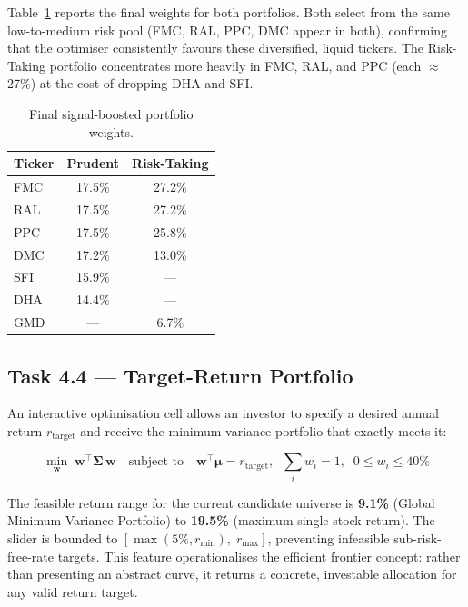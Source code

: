 \documentclass[12pt, a4paper]{article}
\begin{document}
Table~\ref{tab:portfolio_weights} reports the final weights for
both portfolios. Both select from the same low-to-medium risk
pool (FMC, RAL, PPC, DMC appear in both), confirming that the
optimiser consistently favours these diversified, liquid tickers.
The Risk-Taking portfolio concentrates more heavily in FMC, RAL,
and PPC (each $\approx$27\%) at the cost of dropping DHA and SFI.

\begin{table}[h]
\centering
\caption{Final signal-boosted portfolio weights.}
\label{tab:portfolio_weights}
\renewcommand{\arraystretch}{1.3}
\begin{tabular}{lcc}
\hline
\textbf{Ticker} & \textbf{Prudent} & \textbf{Risk-Taking} \\
\hline
FMC & 17.5\% & 27.2\% \\
RAL & 17.5\% & 27.2\% \\
PPC & 17.5\% & 25.8\% \\
DMC & 17.2\% & 13.0\% \\
SFI & 15.9\% & ---    \\
DHA & 14.4\% & ---    \\
GMD & ---    &  6.7\% \\
\hline
\end{tabular}
\end{table}

\subsection{Task 4.4 --- Target-Return Portfolio}

An interactive optimisation cell allows an investor to specify a
desired annual return $r_{\text{target}}$ and receive the
minimum-variance portfolio that exactly meets it:

\begin{equation}
\min_{\mathbf{w}}\; \mathbf{w}^\top \boldsymbol{\Sigma}\, \mathbf{w}
\quad\text{subject to}\quad
\mathbf{w}^\top \boldsymbol{\mu} = r_{\text{target}},\;\;
\sum_i w_i = 1,\;\;
0 \leq w_i \leq 40\%
\label{eq:min_var}
\end{equation}

The feasible return range for the current candidate universe is
\textbf{9.1\%} (Global Minimum Variance Portfolio) to \textbf{19.5\%}
(maximum single-stock return). The slider is bounded to
$[\max(5\%, r_{\min}),\; r_{\max}]$, preventing infeasible
sub-risk-free-rate targets. This feature operationalises the efficient
frontier concept: rather than presenting an abstract curve, it
returns a concrete, investable allocation for any valid return target.
\end{document}
